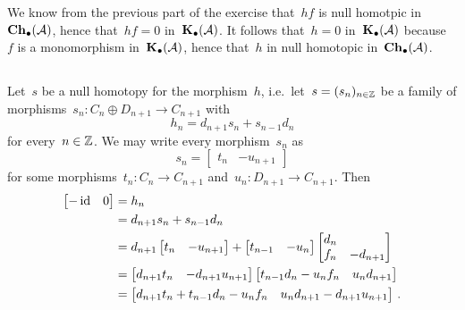 We know from the previous part of the exercise that~$hf$ is null homotpic in~$\mathbf{Ch}_\bullet(\mathcal{A})$, hence that~$hf = 0$ in~$\mathbf{K}_\bullet(\mathcal{A})$.
It follows that~$h = 0$ in~$\mathbf{K}_\bullet(\mathcal{A})$ because~$f$ is a monomorphism in~$\mathbf{K}_\bullet(\mathcal{A})$, hence that~$h$ in null homotopic in~$\mathbf{Ch}_\bullet(\mathcal{A})$.





\subsection{}

Let~$s$ be a null homotopy for the morphism~$h$, i.e.\ let~$s = (s_n)_{n \in \mathbb{Z}}$  be a family of morphisms~$s_n \colon C_n \oplus D_{n+1} \to C_{n+1}$ with
\[
    h_n
  = d_{n+1} s_n + s_{n-1} d_n
\]
for every~$n \in \mathbb{Z}$.
We may write every morphism~$s_n$ as
\[
    s_n
  = \begin{bmatrix}
      t_n & -u_{n+1}
    \end{bmatrix}
\]
for some morphisms~$t_n \colon C_n \to C_{n+1}$ and~$u_n \colon D_{n+1} \to C_{n+1}$.
Then
\begin{align*}
      \begin{bmatrix}
        -\operatorname{id}  & 0
      \end{bmatrix}
  &=  h_n \\
  &=  d_{n+1} s_n + s_{n-1} d_n \\
  &=  d_{n+1}
      \begin{bmatrix}
        t_n & -u_{n+1}
      \end{bmatrix}
      +
      \begin{bmatrix}
        t_{n-1} & -u_n
      \end{bmatrix}
      \begin{bmatrix}
        d_n &           \\
        f_n & -d_{n+1}
      \end{bmatrix} \\
  &=  \begin{bmatrix}
        d_{n+1} t_n & -d_{n+1} u_{n+1}
      \end{bmatrix}
      \begin{bmatrix}
        t_{n-1} d_n - u_n f_n & u_n d_{n+1}
      \end{bmatrix} \\
  &=  \begin{bmatrix}
        d_{n+1} t_n + t_{n-1} d_n - u_n f_n & u_n d_{n+1} - d_{n+1} u_{n+1}
      \end{bmatrix} \,.
\end{align*}
